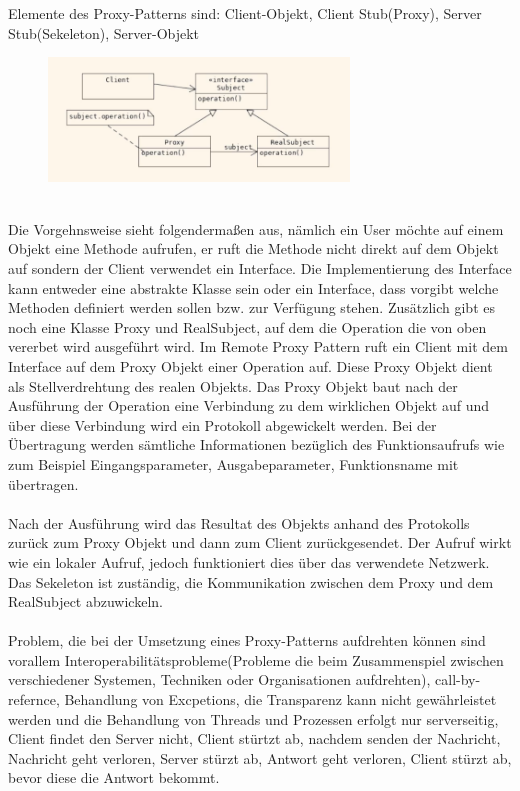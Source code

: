 \documentclass[a4paper,12pt]{article}
\begin{document}
Elemente des Proxy-Patterns sind: Client-Objekt, Client Stub(Proxy), Server Stub(Sekeleton), Server-Objekt\\
\begin{figure}[h]
    \centering
    \includegraphics[width=8cm]{ProxyPattern.png}
\end{figure}
\\
Die Vorgehnsweise sieht folgendermaßen aus, nämlich ein User möchte auf einem Objekt eine Methode aufrufen, er ruft die Methode nicht direkt auf dem Objekt auf sondern der Client verwendet ein Interface. Die Implementierung des Interface kann entweder eine abstrakte Klasse sein oder
ein Interface, dass vorgibt welche Methoden definiert werden sollen bzw. zur Verfügung stehen.
Zusätzlich gibt es noch eine Klasse Proxy und RealSubject, auf dem die Operation die von oben vererbet wird ausgeführt wird. Im Remote Proxy Pattern ruft ein Client mit dem Interface auf dem Proxy Objekt einer Operation auf. Diese Proxy Objekt dient als Stellverdrehtung des realen Objekts. Das Proxy Objekt baut nach der Ausführung der Operation
eine Verbindung zu dem wirklichen Objekt auf und über diese Verbindung wird ein Protokoll abgewickelt werden. Bei der Übertragung werden sämtliche Informationen bezüglich des Funktionsaufrufs wie zum Beispiel Eingangsparameter, Ausgabeparameter, Funktionsname mit übertragen. \\\\
Nach der Ausführung wird das Resultat des Objekts anhand des Protokolls zurück zum Proxy Objekt und dann zum Client zurückgesendet. Der Aufruf wirkt wie ein lokaler Aufruf, jedoch funktioniert dies über das verwendete Netzwerk.
Das Sekeleton ist zuständig, die Kommunikation zwischen dem Proxy und dem RealSubject abzuwickeln.\\\\
Problem, die bei der Umsetzung eines Proxy-Patterns aufdrehten können sind vorallem Interoperabilitätsprobleme(Probleme die beim Zusammenspiel zwischen verschiedener Systemen, Techniken oder Organisationen aufdrehten), call-by-refernce, Behandlung von Excpetions, die Transparenz kann nicht gewährleistet werden und die Behandlung von Threads und Prozessen erfolgt nur serverseitig, Client findet den Server nicht, Client stürtzt ab, nachdem senden der Nachricht, Nachricht geht verloren, Server stürzt ab, Antwort geht verloren, Client stürzt ab, bevor diese die Antwort bekommt.
\end{document}
